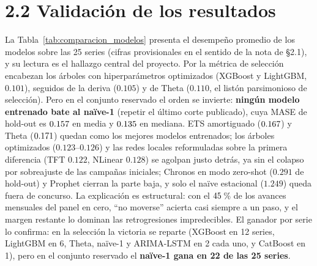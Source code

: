\documentclass[12pt,letterpaper]{report}
\begin{document}
\section{2.2 Validación de los resultados}

La Tabla~\ref{tab:comparacion_modelos} presenta el desempeño promedio de los \factNModels{}
modelos sobre las 25 series (cifras provisionales en el sentido de la nota de §2.1), y su
lectura es el hallazgo central del proyecto. Por la
métrica de selección encabezan los árboles con hiperparámetros optimizados (XGBoost y
LightGBM, $0.101$), seguidos de la deriva ($0.105$) y de Theta ($0.110$, el listón
parsimonioso de selección). Pero en el conjunto reservado el orden se invierte:
\textbf{ningún modelo entrenado bate al naïve-1} (repetir el último corte publicado),
cuya MASE de hold-out es $0.157$ en media y $0.135$ en mediana. ETS amortiguado
($0.167$) y Theta ($0.171$) quedan como los mejores modelos
entrenados; los árboles optimizados ($0.123$--$0.126$) y las redes locales reformuladas
sobre la primera diferencia (TFT $0.122$, NLinear $0.128$) se agolpan justo detrás, ya
sin el colapso por sobreajuste de las campañas iniciales; Chronos en modo zero-shot
($0.291$ de hold-out) y Prophet cierran la parte baja, y solo el naïve estacional
($1.249$) queda fuera de concurso. La explicación es estructural: con el
$45$\,\% de los avances mensuales del panel en cero, ``no moverse'' acierta casi
siempre a un paso, y el margen restante lo dominan las retrogresiones impredecibles. El
ganador por serie lo confirma: en la selección la victoria se reparte (XGBoost en 12
series, LightGBM en 6, Theta, naïve-1 y ARIMA-LSTM en 2 cada uno, y CatBoost en 1), pero
en el conjunto reservado el
\textbf{naïve-1 gana en 22 de las 25 series}.
\end{document}
